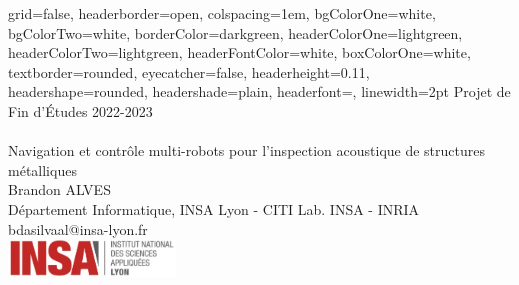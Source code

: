 \documentclass[a0paper,portrait]{baposter}
\begin{document}
	\begin{poster}
		{
			grid=false,
			headerborder=open, %
			colspacing=1em, %
			bgColorOne=white, %
			bgColorTwo=white, %
			borderColor=darkgreen, %
			headerColorOne=lightgreen, %
			headerColorTwo=lightgreen, %
			headerFontColor=white, %
			boxColorOne=white, %
			textborder=rounded, %
			eyecatcher=false, %
			headerheight=0.11\textheight, %
			headershape=rounded, %
			headershade=plain,
			headerfont=\Large\textsf, %
			linewidth=2pt %
		}
		{}
		{
			{\small Projet de Fin d'Études 2022-2023}
			\sf\vspace{0.3em}\\
			\\\textsf
			{Navigation et contrôle multi-robots pour l'inspection acoustique de structures métalliques}
		}
		{
			\sf\vspace{0.5em}\\
			Brandon ALVES
			\vspace{0.1em}\\
			\small{
				Département Informatique, INSA Lyon - CITI Lab. INSA - INRIA
				\vspace{0.2em}\\
				bdasilvaal@insa-lyon.fr
				\vspace{0.2em}\\
			}
		}
		{
			\hspace{0.5cm}
			\includegraphics[height=1cm]{graphics/insa.jpg}
}
\end{poster}
\end{document}

